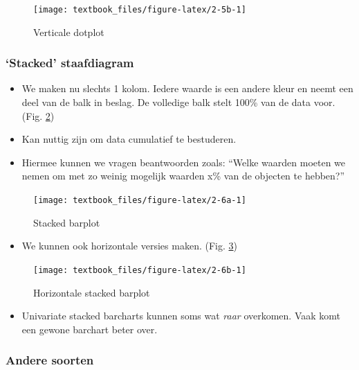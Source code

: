 \documentclass[]{tufte-book}
\providecommand{\tightlist}{%
  \setlength{\itemsep}{0pt}\setlength{\parskip}{0pt}}
\begin{document}
\begin{figure}
\texttt{[image: textbook\_files/figure-latex/2-5b-1]} \caption[Verticale dotplot]{Verticale dotplot}\label{fig:2-5b}
\end{figure}

\hypertarget{stacked-staafdiagram}{%
\subsubsection{`Stacked' staafdiagram}\label{stacked-staafdiagram}}

\begin{itemize}
\tightlist
\item
  We maken nu slechts 1 kolom. Iedere waarde is een andere kleur en neemt een deel van de balk in beslag. De volledige balk stelt 100\% van de data voor. (Fig. \ref{fig:2-6a})
\item
  Kan nuttig zijn om data cumulatief te bestuderen.
\item
  Hiermee kunnen we vragen beantwoorden zoals: ``Welke waarden moeten we nemen om met zo weinig mogelijk waarden x\% van de objecten te hebben?''
\end{itemize}

\begin{figure}

{\centering \texttt{[image: textbook\_files/figure-latex/2-6a-1]} 

}

\caption[Stacked barplot]{Stacked barplot}\label{fig:2-6a}
\end{figure}

\begin{itemize}
\tightlist
\item
  We kunnen ook horizontale versies maken. (Fig. \ref{fig:2-6b})
\end{itemize}

\begin{figure}
\texttt{[image: textbook\_files/figure-latex/2-6b-1]} \caption[Horizontale stacked barplot]{Horizontale stacked barplot}\label{fig:2-6b}
\end{figure}

\begin{itemize}
\tightlist
\item
  Univariate stacked barcharts kunnen soms wat \emph{raar} overkomen. Vaak komt een gewone barchart beter over.
\end{itemize}

\hypertarget{andere-soorten}{%
\subsubsection{Andere soorten}\label{andere-soorten}}
\end{document}
